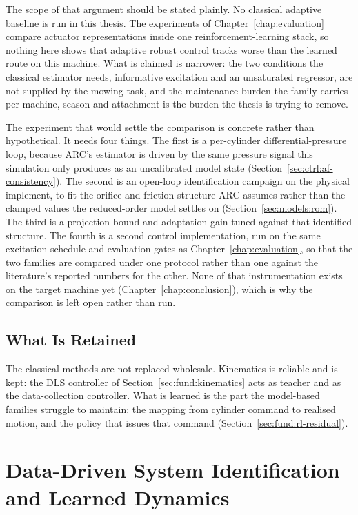 The scope of that argument should be stated plainly. No classical adaptive
baseline is run in this thesis. The experiments of
Chapter~\ref{chap:evaluation} compare actuator representations inside one
reinforcement-learning stack, so nothing here shows that adaptive robust
control tracks worse than the learned route on this machine. What is claimed is
narrower: the two conditions the classical estimator needs, informative
excitation and an unsaturated regressor, are not supplied by the mowing task,
and the maintenance burden the family carries per machine, season and
attachment is the burden the thesis is trying to remove.

The experiment that would settle the comparison is concrete rather than
hypothetical. It needs four things. The first is a per-cylinder
differential-pressure loop, because ARC's estimator is driven by the same
pressure signal this simulation only produces as an uncalibrated model state
(Section~\ref{sec:ctrl:af-consistency}). The second is an open-loop
identification campaign on the physical implement, to fit the orifice and
friction structure ARC assumes rather than the clamped values the reduced-order
model settles on (Section~\ref{sec:models:rom}). The third is a projection bound
and adaptation gain tuned against that identified structure. The fourth is a
second control implementation, run on the same excitation schedule and
evaluation gates as Chapter~\ref{chap:evaluation}, so that the two families are
compared under one protocol rather than one against the literature's reported
numbers for the other. None of that instrumentation exists on the target machine
yet (Chapter~\ref{chap:conclusion}), which is why the comparison is left open
rather than run.

\subsection{What Is Retained}

The classical methods are not replaced wholesale. Kinematics is reliable and is
kept: the DLS controller of Section~\ref{sec:fund:kinematics} acts as teacher
and as the data-collection controller. What is learned is the part the
model-based families struggle to maintain: the mapping from cylinder command to
realised motion, and the policy that issues that command
(Section~\ref{sec:fund:rl-residual}).

\section{Data-Driven System Identification and Learned Dynamics}
\label{sec:fund:learned-dynamics}


